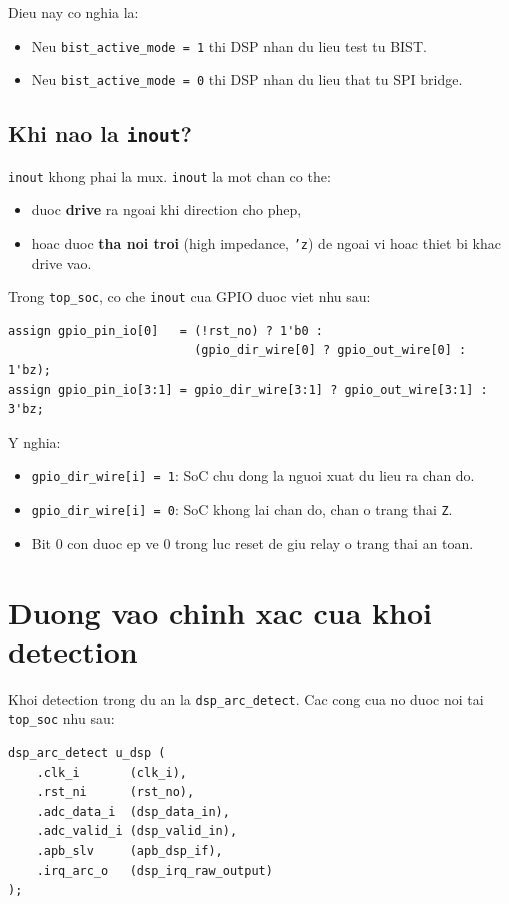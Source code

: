 \documentclass[12pt,a4paper]{article}
\begin{document}
Dieu nay co nghia la:
\begin{itemize}
    \item Neu \texttt{bist\_active\_mode = 1} thi DSP nhan du lieu test tu BIST.
    \item Neu \texttt{bist\_active\_mode = 0} thi DSP nhan du lieu that tu SPI bridge.
\end{itemize}

\subsection{Khi nao la \texttt{inout}?}
\texttt{inout} khong phai la mux. \texttt{inout} la mot chan co the:
\begin{itemize}
    \item duoc \textbf{drive} ra ngoai khi direction cho phep,
    \item hoac duoc \textbf{tha noi troi} (high impedance, \texttt{'z}) de ngoai vi hoac thiet bi khac drive vao.
\end{itemize}

Trong \texttt{top\_soc}, co che \texttt{inout} cua GPIO duoc viet nhu sau:
\begin{lstlisting}[style=svstyle]
assign gpio_pin_io[0]   = (!rst_no) ? 1'b0 :
                          (gpio_dir_wire[0] ? gpio_out_wire[0] : 1'bz);
assign gpio_pin_io[3:1] = gpio_dir_wire[3:1] ? gpio_out_wire[3:1] : 3'bz;
\end{lstlisting}

Y nghia:
\begin{itemize}
    \item \texttt{gpio\_dir\_wire[i] = 1}: SoC chu dong la nguoi xuat du lieu ra chan do.
    \item \texttt{gpio\_dir\_wire[i] = 0}: SoC khong lai chan do, chan o trang thai \texttt{Z}.
    \item Bit 0 con duoc ep ve 0 trong luc reset de giu relay o trang thai an toan.
\end{itemize}

\section{Duong vao chinh xac cua khoi detection}
Khoi detection trong du an la \texttt{dsp\_arc\_detect}. Cac cong cua no duoc noi tai \texttt{top\_soc} nhu sau:
\begin{lstlisting}[style=svstyle]
dsp_arc_detect u_dsp (
    .clk_i       (clk_i),
    .rst_ni      (rst_no),
    .adc_data_i  (dsp_data_in),
    .adc_valid_i (dsp_valid_in),
    .apb_slv     (apb_dsp_if),
    .irq_arc_o   (dsp_irq_raw_output)
);
\end{lstlisting}
\end{document}
